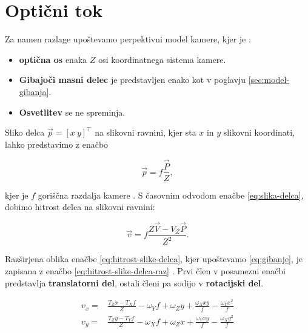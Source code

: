 \section{Optični tok}
Za namen razlage upoštevamo perpektivni model kamere, kjer je \cite{trucco1998introductory}:

\begin{itemize}
\item \textbf{optična os} enaka $Z$ osi koordinatnega sistema kamere.
\item \textbf{Gibajoči masni delec} je predstavljen enako kot v poglavju \ref{sec:model-gibanja}.
\item \textbf{Osvetlitev} se ne spreminja.
\end{itemize}

Sliko delca $\vec{p} = [x~y]^\top$ na slikovni ravnini, kjer sta $x$ in $y$ slikovni koordinati, lahko predstavimo z enačbo

\begin{equation}\label{eq:slika-delca}
	\vec{p} = f \frac{\vec{P}}{Z},
\end{equation}

kjer je $f$ goriščna razdalja kamere \cite{trucco1998introductory}. S časovnim odvodom enačbe \eqref{eq:slika-delca}, dobimo hitrost delca na slikovni ravnini:

\begin{equation}\label{eq:hitrost-slike-delca}
	\vec{v} = f \frac{Z\vec{V}-V_Z\vec{P}}{Z^2}.
\end{equation}

Razširjena oblika enačbe \eqref{eq:hitrost-slike-delca}, kjer upoštevamo \eqref{eq:gibanje}, je zapisana z enačbo \eqref{eq:hitrost-slike-delca-raz} \cite{trucco1998introductory}. Prvi člen v posamezni enačbi predstavlja \textbf{translatorni del}, ostali členi pa sodijo v \textbf{rotacijski del}.

\begin{equation}\label{eq:hitrost-slike-delca-raz}
\begin{aligned}
	v_x = & \frac{T_Z x - T_X f}{Z} - \omega_Y f + \omega_Z y + \frac{\omega_X x y}{f} - \frac{\omega_Y x^2}{f} \\
    v_y = & \frac{T_Z y - T_Y f}{Z} - \omega_X f + \omega_Z x + \frac{\omega_Y x y}{f} - \frac{\omega_X y^2}{f}
\end{aligned}
\end{equation}

